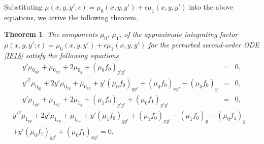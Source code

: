 \documentclass[11pt,letter,subeqn]{article}
\def\beq{\begin{equation}}
\def\eeq{\end{equation}}
\def\barr{\begin{array}{ll}}
\def\earr{\end{array}}
\newtheorem{theorem}{Theorem}[section]
\begin{document}
Substituting $\mu(x,y,y';\epsilon)=\mu_0(x,y,y')+\epsilon \mu_1(x,y,y')$ into the above equations, we arrive the following theorem.
\begin{theorem}
  The components $\mu_0$, $\mu_1$, of the approximate integrating factor $\mu(x,y,y';\epsilon)=\mu_0(x,y,y')+\epsilon \mu_1(x,y,y')$ for the perturbed second-order ODE \eqref{IF18} satisfy the following equations
  \begin{eqnarray}
    y'\mu_{0_{yy'}}+\mu_{0_{xy'}}+2\mu_{0_{y}}+(\mu_0 f_0)_{y'y'} &=& 0,\label{IF20} \\[2ex]
    y'^2\mu_{0_{yy}}+2y'\mu_{0_{xy}}+\mu_{0_{xx}}+y'(\mu_0 f_0)_{yy'}+(\mu_0 f_0)_{xy'}- (\mu_0 f_0)_{y}&=& 0,\label{IF21} \\[2ex]
     y'\mu_{1_{yy'}}+\mu_{1_{xy'}}+2\mu_{1_{y}}+(\mu_1 f_0)_{y'y'}+(\mu_0 f_1)_{y'y'} &=& 0,\label{IF22}
       \end{eqnarray}
        \beq \label{IF23}
\barr
   y'^2\mu_{1_{yy}}+2y'\mu_{1_{xy}}+\mu_{1_{xx}}+y'(\mu_1 f_0)_{yy'}+(\mu_1 f_0)_{xy'}-(\mu_1 f_0)_{y}-(\mu_0 f_1)_{y}& \\[2ex]
   +y'(\mu_0 f_1)_{yy'}+(\mu_0 f_1)_{xy'} = 0.
\earr
\eeq
\end{theorem}
\end{document}
